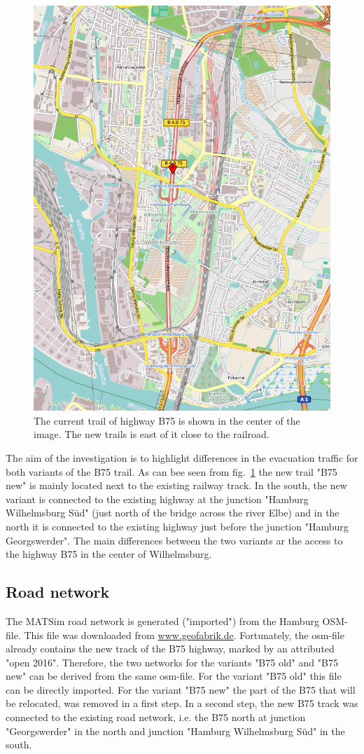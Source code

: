 \begin{figure}[!ht]
	\centering
	\includegraphics[width=0.7\linewidth]{extending/figures/Evacuation/B75overview}
	\caption[New and old section of B75]{The current trail of highway B75 is shown in the center of the image. The new trails is east of it close to the railroad.}
	\label{fig:overviewB75}
\end{figure}

The aim of the investigation is to highlight differences in the evacuation traffic for both variants of the B75 trail. As can bee seen from fig.~\ref{fig:overviewB75} the new trail "B75 new" is mainly located next to the existing railway track.
In the south, the new variant is connected to the existing highway at the junction "Hamburg Wilhelmsburg S\"ud" (just north of the bridge across the river Elbe) and in the north it is connected to the existing highway just before the junction "Hamburg Georgswerder". 
The main differences between the two variants ar the access to the highway B75 in the center of Wilhelmsburg.

\subsection{Road network}
The MATSim road network is generated ("imported") from the Hamburg OSM-file. This file was downloaded from \url{www.geofabrik.de}. Fortunately, the osm-file already contains the new track of the B75 highway, marked by an attributed "open 2016". Therefore, the two networks for the variants "B75 old" and "B75 new" can be derived from the same osm-file. For the variant "B75 old" this file can be directly imported. For the variant "B75 new" the part of the B75 that will be relocated, was removed in a first step. In a second step, the new B75 track was connected to the existing road network, i.e. the B75 north at junction "Georgswerder" in the north and junction "Hamburg Wilhelmsburg S\"ud" in the south.

